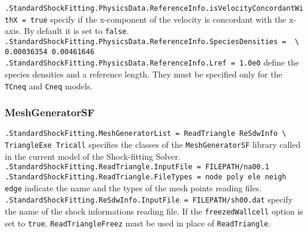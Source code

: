\documentclass[11pt,a4paper,oneside]{article}
\begin{document}
\hspace*{1cm} \texttt{.StandardShockFitting.PhysicsData.ReferenceInfo.isVelocityConcordantWithX = true}
\newline
\newline
specify if the x-component of the velocity is concordant with the x-axis. By default it is set to \texttt{false}.
\newline
\newline
\hspace*{1cm} \texttt{.StandardShockFitting.PhysicsData.ReferenceInfo.SpeciesDensities = \texttt{ \textbackslash{}}}
\newline
\hspace*{1.3cm} \texttt{0.00036354 0.00461646}
\newline
\hspace*{1cm} \texttt{.StandardShockFitting.PhysicsData.ReferenceInfo.Lref = 1.0e0}
\newline
\newline
define the species densities and a reference length. They must be specified only for the \texttt{TCneq} and \texttt{Cneq} models.

\subsubsection{MeshGeneratorSF}

\hspace*{1cm}\texttt{.StandardShockFitting.MeshGeneratorList = ReadTriangle ReSdwInfo \textbackslash{}}
\newline
\hspace*{9.5cm} \texttt{TriangleExe Tricall}
\newline
\newline
specifies the classes of the \texttt{MeshGeneratorSF} library called in the current model of the Shock-fitting Solver.
\newline
\newline
\hspace*{1cm} \texttt{.StandardShockFitting.ReadTriangle.InputFile = FILEPATH/na00.1}
\newline
\hspace*{1cm} \texttt{.StandardShockFitting.ReadTriangle.FileTypes = node poly ele neigh edge}
\newline
\newline
indicate the name  and the types of the mesh points reading files.
\newline
\newline
\hspace*{1cm} \texttt{.StandardShockFitting.ReSdwInfo.InputFile = FILEPATH/sh00.dat}
\newline
\newline
specify the name of the shock informations reading file.
\newline
If the \texttt{freezedWallcell} option is set to \texttt{true}, \texttt{ReadTriangleFreez} must be used in place of \texttt{ReadTriangle}.
\end{document}
